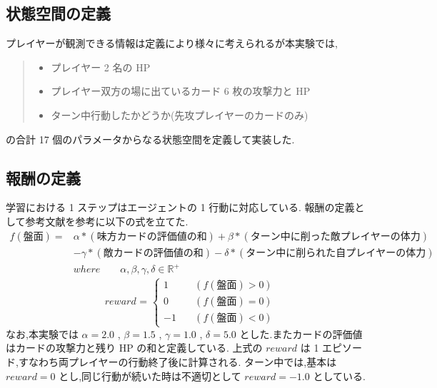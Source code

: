 \documentclass{jarticle}     %
\begin{document}
\subsection{状態空間の定義}
プレイヤーが観測できる情報は定義により様々に考えられるが本実験では,
\begin{quote}
  \begin{itemize}
   \item プレイヤー 2 名の HP
   \item プレイヤー双方の場に出ているカード 6 枚の攻撃力と HP 
   \item ターン中行動したかどうか(先攻プレイヤーのカードのみ)
  \end{itemize}
 \end{quote}
の合計 17 個のパラメータからなる状態空間を定義して実装した.

\subsection{報酬の定義}
学習における 1 ステップはエージェントの 1 行動に対応している.
報酬の定義として参考文献を参考に以下の式を立てた\cite{reward}.
\begin{equation*}
  \begin{split}
    f(\mathrm{盤面}) = 
    &\alpha*\mathrm{(味方カードの評価値の和)}+\beta*\mathrm{(ターン中に削った敵プレイヤーの体力)}\\
   & - \gamma*\mathrm{(敵カードの評価値の和)} - \delta*\mathrm{(ターン中に削られた自プレイヤーの体力)}\\
    &where \qquad \alpha , \beta , \gamma , \delta \in \mathbb{R}^+
  \end{split}
\end{equation*}
\begin{equation*}
  \quad reward \text{ = }
  \left\{
    \begin{aligned}
        1 \quad &(f(\mathrm{盤面}) > 0) \\
        0 \quad &(f(\mathrm{盤面}) = 0) \\
        -1 \quad &(f(\mathrm{盤面}) < 0)
    \end{aligned}
    \right.
\end{equation*}
なお,本実験では $\alpha = 2.0$ , $\beta = 1.5$ , $\gamma = 1.0$ , $\delta = 5.0$ とした.またカードの評価値はカードの攻撃力と残り HP の和と定義している.
上式の $reward$ は 1 エピソード,すなわち両プレイヤーの行動終了後に計算される.
ターン中では,基本は $reward = 0$ とし,同じ行動が続いた時は不適切として $reward = -1.0$ としている.
\end{document}
